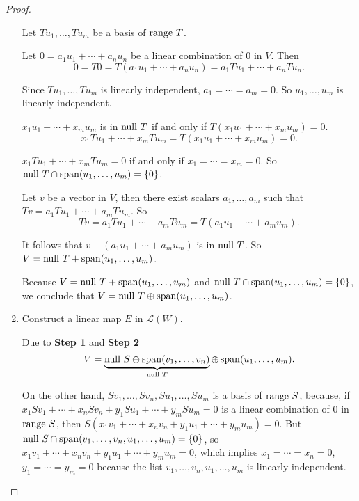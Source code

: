 \begin{proof}
\begin{enumerate}[label={\textbf{Step \arabic*.}},itemindent={1cm}]
              Let $Tu_{1}, \ldots, Tu_{m}$ be a basis of $\operatorname{range}\,{T}$.

              Let $0 = a_{1}u_{1} + \cdots + a_{n}u_{n}$ be a linear combination of $0$ in $V$. Then
              \[
                  0 = T0 = T(a_{1}u_{1} + \cdots + a_{n}u_{n}) = a_{1}Tu_{1} + \cdots + a_{n}Tu_{n}.
              \]

              Since $Tu_{1}, \ldots, Tu_{m}$ is linearly independent, $a_{1} = \cdots = a_{m} = 0$. So $u_{1}, \ldots, u_{m}$ is linearly independent.

              $x_{1}u_{1} + \cdots + x_{m}u_{m}$ is in $\operatorname{null}\,{T}$ if and only if $T(x_{1}u_{1} + \cdots + x_{m}u_{m}) = 0$.
              \[
                  x_{1}Tu_{1} + \cdots + x_{m}Tu_{m} = T(x_{1}u_{1} + \cdots + x_{m}u_{m}) = 0.
              \]

              $x_{1}Tu_{1} + \cdots + x_{m}Tu_{m} = 0$ if and only if $x_{1} = \cdots = x_{m} = 0$. So $\operatorname{null}\,{T}\cap\operatorname{span}(u_{1}, \ldots, u_{m}) = \{0\}$.

              Let $v$ be a vector in $V$, then there exist scalars $a_{1}, \ldots, a_{m}$ such that $Tv = a_{1}Tu_{1} + \cdots + a_{m}Tu_{m}$. So
              \[
                  Tv = a_{1}Tu_{1} + \cdots + a_{m}Tu_{m} = T(a_{1}u_{1} + \cdots + a_{m}u_{m}).
              \]

              It follows that $v - (a_{1}u_{1} + \cdots + a_{m}u_{m})$ is in $\operatorname{null}\,{T}$. So $V = \operatorname{null}\,{T} + \operatorname{span}(u_{1}, \ldots, u_{m})$.

              Because $V = \operatorname{null}\,{T} + \operatorname{span}(u_{1}, \ldots, u_{m})$ and $\operatorname{null}\,{T}\cap \operatorname{span}(u_{1}, \ldots, u_{m}) = \{0\}$, we conclude that $V = \operatorname{null}\,{T}\oplus \operatorname{span}(u_{1}, \ldots, u_{m})$.
        \item Construct a linear map $E$ in $\mathcal{L}(W)$.

              Due to \textbf{Step 1} and \textbf{Step 2}
              \[
                  V = \underbrace{\operatorname{null}\,{S} \oplus \operatorname{span}(v_{1}, \ldots, v_{n})}_{\operatorname{null}\,{T}} \oplus \operatorname{span}(u_{1}, \ldots, u_{m}).
              \]

              On the other hand, $Sv_{1}, \ldots, Sv_{n}, Su_{1}, \ldots, Su_{m}$ is a basis of $\operatorname{range}\,{S}$, because, if $x_{1}Sv_{1} + \cdots + x_{n}Sv_{n} + y_{1}Su_{1} + \cdots + y_{m}Su_{m} = 0$ is a linear combination of $0$ in $\operatorname{range}\,{S}$, then $S(x_{1}v_{1} + \cdots + x_{n}v_{n} + y_{1}u_{1} + \cdots + y_{m}u_{m}) = 0$. But $\operatorname{null}\,{S}\cap \operatorname{span}(v_{1}, \ldots, v_{n}, u_{1}, \ldots, u_{m}) = \{0\}$, so $x_{1}v_{1} + \cdots + x_{n}v_{n} + y_{1}u_{1} + \cdots + y_{m}u_{m} = 0$, which implies $x_{1} = \cdots = x_{n} = 0$, $y_{1} = \cdots = y_{m} = 0$ because the list $v_{1}, \ldots, v_{n}, u_{1}, \ldots, u_{m}$ is linearly independent.


\end{enumerate}
\end{proof}
